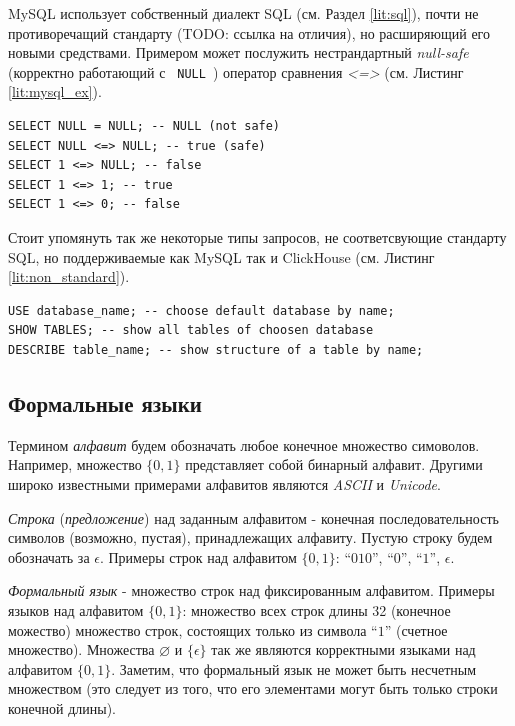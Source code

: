 MySQL использует собственный диалект SQL (см. Раздел \ref{lit:sql}), почти не противоречащий стандарту (TODO: ссылка на отличия), но расширяющий его новыми средствами. Примером может послужить нестрандартный \textit{null-safe} (корректно работающий с \texttt{ NULL }) оператор сравнения \textit{<=>} (см. Листинг \ref{lit:mysql_ex}).

\begin{code}
    \label{lit:mysql_ex}
    \begin{verbatim}
SELECT NULL = NULL; -- NULL (not safe)
SELECT NULL <=> NULL; -- true (safe)
SELECT 1 <=> NULL; -- false
SELECT 1 <=> 1; -- true
SELECT 1 <=> 0; -- false
    \end{verbatim}
\end{code}

Стоит упомянуть так же некоторые типы запросов, не соответсвующие стандарту SQL, но поддерживаемые как MySQL так и ClickHouse (см. Листинг \ref{lit:non_standard}).

\begin{code}
    \label{lit:non_standard}
    \begin{verbatim}
USE database_name; -- choose default database by name;
SHOW TABLES; -- show all tables of choosen database
DESCRIBE table_name; -- show structure of a table by name;
    \end{verbatim}
\end{code}


\subsection{Формальные языки}
Термином \textit{алфавит} будем обозначать любое конечное множество симоволов. Например, множество $\{0, 1\}$ представляет собой бинарный алфавит. Другими широко известными примерами алфавитов являются \textit{ASCII} и \textit{Unicode}. 

\textit{Строка} (\textit{предложение}) над заданным алфавитом - конечная последовательность символов (возможно, пустая), принадлежащих алфавиту. Пустую строку будем обозначать за $\epsilon$. Примеры строк над алфавитом $\{0, 1\}$: \enquote{$010$}, \enquote{$0$}, \enquote{$1$}, $\epsilon$.

\textit{Формальный язык} - множество строк над фиксированным алфавитом. Примеры языков над алфавитом $\{0, 1\}$: множество всех строк длины 32 (конечное можество) множество строк, состоящих только из символа \enquote{$1$} (счетное множество). Множества $\varnothing$ и $\{\epsilon\}$ так же являются корректными языками над алфавитом $\{0, 1\}$. Заметим, что формальный язык не может быть несчетным множеством (это следует из того, что его элементами могут быть только строки конечной длины).

